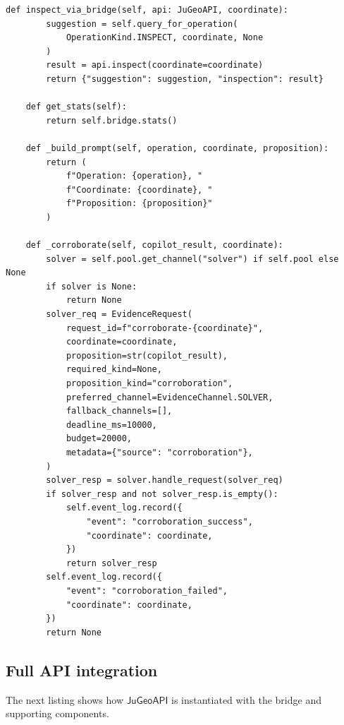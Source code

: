 \documentclass[11pt]{article}
\newcommand{\JuGeoAPI}{\mathsf{JuGeoAPI}}
\begin{document}
\begin{lstlisting}[style=jugeo-python,
  caption={Core CopilotAPIBridge implementation},
  label={lst:bridge}]
    def inspect_via_bridge(self, api: JuGeoAPI, coordinate):
        suggestion = self.query_for_operation(
            OperationKind.INSPECT, coordinate, None
        )
        result = api.inspect(coordinate=coordinate)
        return {"suggestion": suggestion, "inspection": result}

    def get_stats(self):
        return self.bridge.stats()

    def _build_prompt(self, operation, coordinate, proposition):
        return (
            f"Operation: {operation}, "
            f"Coordinate: {coordinate}, "
            f"Proposition: {proposition}"
        )

    def _corroborate(self, copilot_result, coordinate):
        solver = self.pool.get_channel("solver") if self.pool else None
        if solver is None:
            return None
        solver_req = EvidenceRequest(
            request_id=f"corroborate-{coordinate}",
            coordinate=coordinate,
            proposition=str(copilot_result),
            required_kind=None,
            proposition_kind="corroboration",
            preferred_channel=EvidenceChannel.SOLVER,
            fallback_channels=[],
            deadline_ms=10000,
            budget=20000,
            metadata={"source": "corroboration"},
        )
        solver_resp = solver.handle_request(solver_req)
        if solver_resp and not solver_resp.is_empty():
            self.event_log.record({
                "event": "corroboration_success",
                "coordinate": coordinate,
            })
            return solver_resp
        self.event_log.record({
            "event": "corroboration_failed",
            "coordinate": coordinate,
        })
        return None
\end{lstlisting}

\subsection{Full API integration}

The next listing shows how $\JuGeoAPI$ is instantiated
with the bridge and supporting components.
\end{document}
